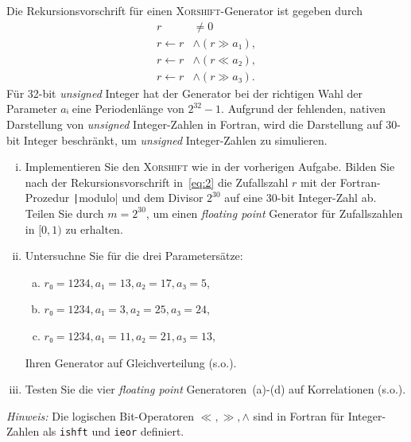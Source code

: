 \begin{question}[subtitle=\textsc{Xorshift}-Generatoren]
  Die Rekursionsvorschrift für einen \textsc{Xorshift}-Generator ist gegeben durch
  \begin{equation}
    \label{eq:2}
    \begin{split}
      r & ≠ 0 \\
      r ← r & ∧ (r ≫ a₁), \\
      r ← r & ∧ (r ≪ a₂), \\
      r ← r & ∧ (r ≫ a₃).
    \end{split}
  \end{equation}
  Für \num{32}-bit \textit{unsigned} Integer hat der Generator bei der richtigen Wahl der Parameter $aᵢ$ eine Periodenlänge von $2^{32} - 1$.
  Aufgrund der fehlenden, nativen Darstellung von \textit{unsigned} Integer-Zahlen in Fortran, wird die Darstellung auf \num{30}-bit Integer beschränkt, um \textit{unsigned} Integer-Zahlen zu simulieren.
  \begin{enumerate}[(i)]
  \item Implementieren Sie den \textsc{Xorshift} wie in der vorherigen Aufgabe.
    Bilden Sie nach der Rekursionsvorschrift in~\cref{eq:2} die Zufallszahl $r$ mit der Fortran-Prozedur \texttt|modulo| und dem Divisor $2^{30}$ auf eine 30-bit Integer-Zahl ab.
    Teilen Sie durch $m = 2^{30}$, um einen \textit{floating point} Generator für Zufallszahlen in $[0, 1)$ zu erhalten.
  \item Untersuchne Sie für die drei Parametersätze:
    \begin{enumerate}[(a)]
    \item\label{item:7} $r₀ = 1234, a₁ = 13, a₂ = 17, a₃ = 5$,
    \item\label{item:5} $r₀ = 1234, a₁ = 3, a₂ = 25, a₃ = 24$,
    \item\label{item:6} $r₀ = 1234, a₁ = 11, a₂ = 21, a₃ = 13$,
    \end{enumerate}
    Ihren Generator auf Gleichverteilung (s.o.).
  \item Testen Sie die vier \textit{floating point} Generatoren~(a)-(d) auf Korrelationen (s.o.).
  \end{enumerate}

  \textit{Hinweis:} Die logischen Bit-Operatoren $≪, ≫, ∧$ sind in Fortran für Integer-Zahlen als \texttt{ishft} und \texttt{ieor} definiert.
\end{question}
